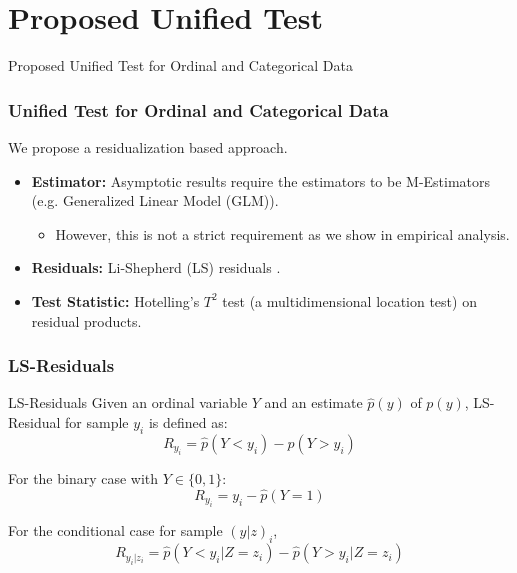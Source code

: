 \documentclass{beamer}
\begin{document}
\section{Proposed Unified Test}
\begin{frame}
	\begin{center} \Huge{Proposed Unified Test for Ordinal and Categorical Data} \end{center}
\end{frame}
\begin{frame}
	\frametitle{Unified Test for Ordinal and Categorical Data}
	We propose a residualization based approach.
	\vspace{1em}
	\begin{itemize}
		\setlength\itemsep{1em}
		\item \textbf{Estimator:} Asymptotic results require the
			estimators to be M-Estimators (e.g. Generalized Linear
			Model (GLM)).
			\begin{itemize}
				\item However, this is not a strict requirement as we show in empirical analysis.
			\end{itemize}
		\item \textbf{Residuals:} Li-Shepherd (LS) residuals \footnotemark.
		\item \textbf{Test Statistic:} Hotelling's $ T^2 $ test (a
			multidimensional location test) on residual products.
	\end{itemize}
\end{frame}


\begin{frame}
	\frametitle{LS-Residuals}
	\begin{block}{LS-Residuals}
	Given an ordinal variable $ Y $ and an estimate $ \hat{p}(y) $ of $
	p(y) $, LS-Residual for sample $ y_i $ is defined as:
	$$ R_{y_i} = \hat{p}(Y < y_i) - \hat{p}(Y > y_i) $$
	\end{block}

	For the binary case with $ Y \in \{0, 1\} $:
	$$ R_{y_i} = y_i - \hat{p}(Y = 1) $$

	For the conditional case for sample $ (y|z)_i $,
	$$ R_{y_i | z_i} = \hat{p}(Y < y_i | Z=z_i) - \hat{p}(Y>y_i|Z=z_i) $$

\end{frame}
\end{document}
